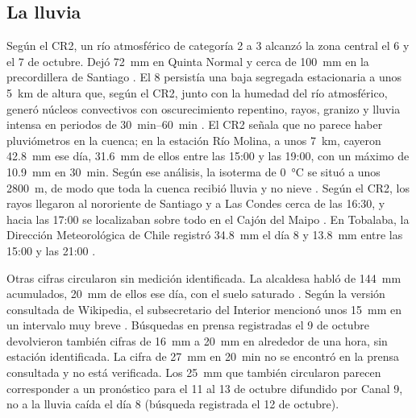 \subsection*{La lluvia}
Según el CR2, un río atmosférico de categoría 2 a 3 alcanzó la zona central el 6 y el 7 de octubre. Dejó \SI{72}{mm} en Quinta Normal y cerca de \SI{100}{mm} en la precordillera de Santiago \citep{cr2_2026}. El 8 persistía una baja segregada estacionaria a unos \SI{5}{km} de altura que, según el CR2, junto con la humedad del río atmosférico, generó núcleos convectivos con oscurecimiento repentino, rayos, granizo y lluvia intensa en periodos de \SIrange{30}{60}{min} \citep{cr2_2026}. El CR2 señala que no parece haber pluviómetros en la cuenca; en la estación Río Molina, a unos \SI{7}{km}, cayeron \SI{42,8}{mm} ese día, \SI{31,6}{mm} de ellos entre las 15:00 y las 19:00, con un máximo de \SI{10,9}{mm} en \SI{30}{min}. Según ese análisis, la isoterma de \SI{0}{\celsius} se situó a unos \SI{2800}{m}, de modo que toda la cuenca recibió lluvia y no nieve \citep{cr2_2026}. Según el CR2, los rayos llegaron al nororiente de Santiago y a Las Condes cerca de las 16:30, y hacia las 17:00 se localizaban sobre todo en el Cajón del Maipo \citep{cr2_2026}. En Tobalaba, la Dirección Meteorológica de Chile registró \SI{34,8}{mm} el día 8 y \SI{13,8}{mm} entre las 15:00 y las 21:00 \citep{dmc2026}.

Otras cifras circularon sin medición identificada. La alcaldesa habló de \SI{144}{mm} acumulados, \SI{20}{mm} de ellos ese día, con el suelo saturado \citep{interferencia2026}. Según la versión consultada de Wikipedia, el subsecretario del Interior mencionó unos \SI{15}{mm} en un intervalo muy breve \citep{wikipedia2026}. Búsquedas en prensa registradas el 9 de octubre devolvieron también cifras de \SI{16}{mm} a \SI{20}{mm} en alrededor de una hora, sin estación identificada. La cifra de \SI{27}{mm} en \SI{20}{min} no se encontró en la prensa consultada y no está verificada. Los \SI{25}{mm} que también circularon parecen corresponder a un pronóstico para el 11 al 13 de octubre difundido por Canal 9, no a la lluvia caída el día 8 (búsqueda registrada el 12 de octubre).

